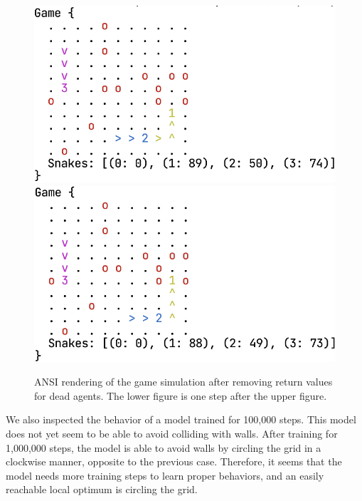 \documentclass[conference]{IEEEtran}
\begin{document}
\begin{figure}
    \centering
    \includegraphics[width=\linewidth]{game_render_eg2.png}\\[12pt]
    \includegraphics[width=\linewidth]{game_render_eg3.png}
    \caption{ANSI rendering of the game simulation after removing return values
        for dead agents. The lower figure is one step after the upper figure.
    }
    \label{fig:render2}
\end{figure}

We also inspected the behavior of a model trained for 100,000 steps.
This model does not yet seem to be able to avoid colliding with walls.
After training for 1,000,000 steps,
the model is able to avoid walls by circling the grid in a clockwise manner,
opposite to the previous case. Therefore,
it seems that the model needs more training steps to learn proper behaviors,
and an easily reachable local optimum is circling the grid.
\end{document}
